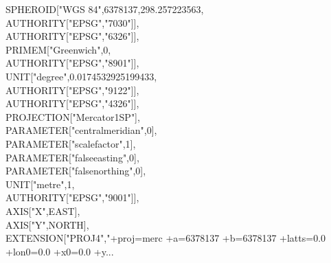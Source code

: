 \documentclass {article}
\begin{document}
\hspace*{6mm} SPHEROID["WGS 84",6378137,298.257223563,\\
\hspace*{8mm} AUTHORITY["EPSG","7030"]],\\
\hspace*{6mm} AUTHORITY["EPSG","6326"]],\\
\hspace*{4mm} PRIMEM["Greenwich",0,\\
\hspace*{6mm} AUTHORITY["EPSG","8901"]],\\
\hspace*{4mm} UNIT["degree",0.0174532925199433,\\
\hspace*{6mm} AUTHORITY["EPSG","9122"]],\\
\hspace*{4mm} AUTHORITY["EPSG","4326"]],\\
\hspace*{2mm} PROJECTION["Mercator\underline{\space}1SP"],\\
\hspace*{2mm} PARAMETER["central\underline{\space}meridian",0],\\
\hspace*{2mm} PARAMETER["scale\underline{\space}factor",1],\\
\hspace*{2mm} PARAMETER["false\underline{\space}easting",0],\\
\hspace*{2mm} PARAMETER["false\underline{\space}northing",0],\\
\hspace*{2mm} UNIT["metre",1,\\
\hspace*{4mm} AUTHORITY["EPSG","9001"]],\\
\hspace*{2mm} AXIS["X",EAST],\\
\hspace*{2mm} AXIS["Y",NORTH],\\
\hspace*{2mm} EXTENSION["PROJ4","+proj=merc +a=6378137 +b=6378137 +lat\underline{\space}ts=0.0 +lon\underline{\space}0=0.0 +x\underline{\space}0=0.0 +y...\\
\\
\end{document}
